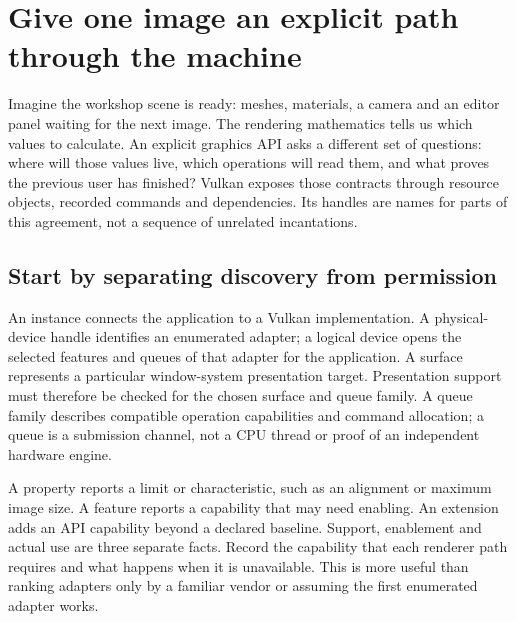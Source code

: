 \section{Give one image an explicit path through the machine}\label{01-foundations-i-ch011-give-one-image-an-explicit-path-through-the-machine}

\hypertarget{01-foundations-i-ch011-give-one-image-an-explicit-path-through-the-machine}{}

Imagine the workshop scene is ready: meshes, materials, a camera and an editor panel waiting for the next image. The rendering mathematics tells us which values to calculate. An explicit graphics API asks a different set of questions: where will those values live, which operations will read them, and what proves the previous user has finished? Vulkan exposes those contracts through resource objects, recorded commands and dependencies. Its handles are names for parts of this agreement, not a sequence of unrelated incantations.

\subsection{Start by separating discovery from permission}\label{01-foundations-i-ch011-start-by-separating-discovery-from-permission}

\hypertarget{01-foundations-i-ch011-start-by-separating-discovery-from-permission}{}

An instance connects the application to a Vulkan implementation. A physical-device handle identifies an enumerated adapter; a logical device opens the selected features and queues of that adapter for the application. A surface represents a particular window-system presentation target. Presentation support must therefore be checked for the chosen surface and queue family. A queue family describes compatible operation capabilities and command allocation; a queue is a submission channel, not a CPU thread or proof of an independent hardware engine.

A property reports a limit or characteristic, such as an alignment or maximum image size. A feature reports a capability that may need enabling. An extension adds an API capability beyond a declared baseline. Support, enablement and actual use are three separate facts. Record the capability that each renderer path requires and what happens when it is unavailable. This is more useful than ranking adapters only by a familiar vendor or assuming the first enumerated adapter works.

